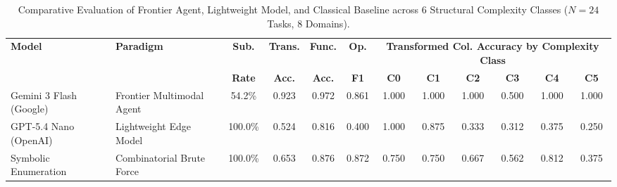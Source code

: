 \begin{table}[t]
\centering
\small
\caption{Comparative Evaluation of Frontier Agent, Lightweight Model, and Classical Baseline across 6 Structural Complexity Classes ($N=24$ Tasks, 8 Domains).}
\label{tab:main_model_comparison}
\begin{tabular}{llcccccccccc}
\toprule
\multirow{2}{*}{\textbf{Model}} & \multirow{2}{*}{\textbf{Paradigm}} & \textbf{Sub.} & \textbf{Trans.} & \textbf{Func.} & \textbf{Op.} & \multicolumn{6}{c}{\textbf{Transformed Col. Accuracy by Complexity Class}} \\
\cmidrule(lr){7-12}
 & & \textbf{Rate} & \textbf{Acc.} & \textbf{Acc.} & \textbf{F1} & \textbf{C0} & \textbf{C1} & \textbf{C2} & \textbf{C3} & \textbf{C4} & \textbf{C5} \\
\midrule
Gemini 3 Flash (Google) & Frontier Multimodal Agent & 54.2\% & 0.923 & 0.972 & 0.861 & 1.000 & 1.000 & 1.000 & 0.500 & 1.000 & 1.000 \\
GPT-5.4 Nano (OpenAI) & Lightweight Edge Model & 100.0\% & 0.524 & 0.816 & 0.400 & 1.000 & 0.875 & 0.333 & 0.312 & 0.375 & 0.250 \\
Symbolic Enumeration & Combinatorial Brute Force & 100.0\% & 0.653 & 0.876 & 0.872 & 0.750 & 0.750 & 0.667 & 0.562 & 0.812 & 0.375 \\
\bottomrule
\end{tabular}
\end{table}